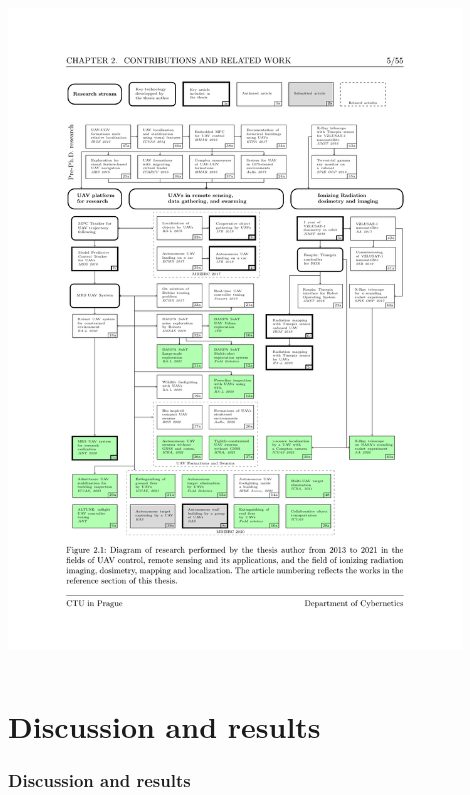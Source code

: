 \documentclass[aspectratio=169]{beamer}
\begin{document}
\begin{frame}
\begin{columns}[c]
\centering


\includegraphics[width=0.9\textwidth,trim={2.0cm 5.0cm 2.5cm 5.2cm},clip]{./fig/pubgraph.pdf}

\end{columns}

\end{frame}


\section{Discussion and results}


\begin{frame}
\frametitle{Discussion and results}



\end{frame}

\end{document}
